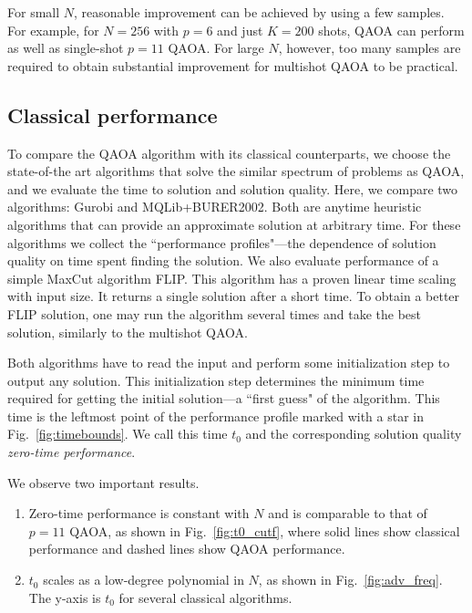 For small $N$, reasonable improvement can be achieved by using a few samples. For example, for $N=256$ with $p=6$ and just $K=200$ shots, QAOA can perform as well as single-shot $p=11$ QAOA. For large $N$, however, too many samples are required to obtain substantial improvement for multishot QAOA to be practical.



\subsection{Classical performance}\label{sec:classicalperformance}




To compare the QAOA algorithm with its classical counterparts, we choose the state-of-the art algorithms that solve the similar spectrum of problems as QAOA, and we  evaluate the time to solution and solution quality. Here, we compare  two algorithms: Gurobi and MQLib+BURER2002. 
Both are anytime heuristic algorithms that can provide an approximate solution at arbitrary time. For these algorithms we 
collect the ``performance profiles"---the dependence of solution quality on time spent  finding the solution.
We also evaluate performance of a simple MaxCut algorithm FLIP. This algorithm has a proven linear time scaling with input size. It returns a single solution after a short time. To obtain a better FLIP solution, one may run the algorithm several times and take the best solution, similarly to the multishot QAOA.

Both algorithms have to read the input and perform some initialization step to output any solution. This initialization step determines the minimum time required for getting the initial 
solution---a ``first guess" of the algorithm. This time is the leftmost point of the performance profile marked with a star in Fig.~\ref{fig:timebounds}. 
We call this time $t_0$ and the corresponding solution quality \emph{zero-time performance}.

We observe two important results.
\begin{enumerate}
    \item Zero-time performance is constant with $N$ and is comparable to that of $p=11$ QAOA,
    as shown in Fig.~\ref{fig:t0_cutf}, where solid lines show classical performance and dashed lines show QAOA performance.
    \item $t_0$ scales as a low-degree polynomial in $N$, as shown in Fig.~\ref{fig:adv_freq}. The y-axis is $t_0$ for several classical algorithms.
\end{enumerate}

